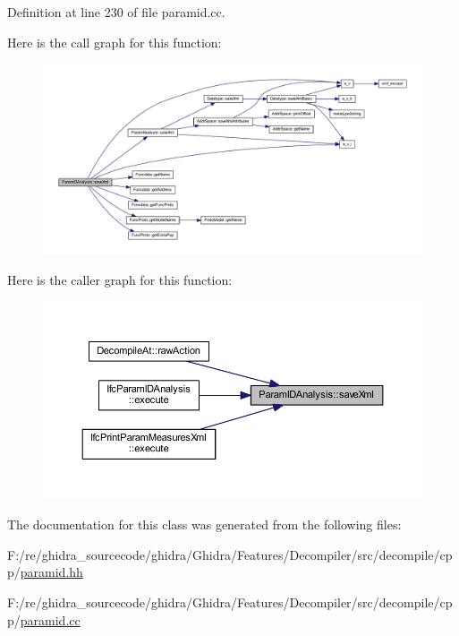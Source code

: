 Definition at line 230 of file paramid.\+cc.

Here is the call graph for this function\+:
\nopagebreak
\begin{figure}[H]
\begin{center}
\leavevmode
\includegraphics[width=350pt]{class_param_i_d_analysis_a50452520f5707bb1440ad9a88ab278cc_cgraph}
\end{center}
\end{figure}
Here is the caller graph for this function\+:
\nopagebreak
\begin{figure}[H]
\begin{center}
\leavevmode
\includegraphics[width=350pt]{class_param_i_d_analysis_a50452520f5707bb1440ad9a88ab278cc_icgraph}
\end{center}
\end{figure}


The documentation for this class was generated from the following files\+:\begin{DoxyCompactItemize}
\item 
F\+:/re/ghidra\+\_\+sourcecode/ghidra/\+Ghidra/\+Features/\+Decompiler/src/decompile/cpp/\mbox{\hyperlink{paramid_8hh}{paramid.\+hh}}\item 
F\+:/re/ghidra\+\_\+sourcecode/ghidra/\+Ghidra/\+Features/\+Decompiler/src/decompile/cpp/\mbox{\hyperlink{paramid_8cc}{paramid.\+cc}}\end{DoxyCompactItemize}
